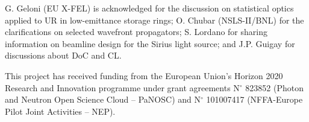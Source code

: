 \documentclass{iucr}              %
\begin{document}

{}

G. Geloni (EU X-FEL) is acknowledged for the discussion on statistical optics applied to UR in low-emittance storage rings; O. Chubar (NSLS-II/BNL) for the clarifications on selected wavefront propagators; S. Lordano for sharing information on beamline design for the Sirius light source; and J.P. Guigay for discussions about DoC and CL.


This project has received funding from the European Union’s Horizon 2020 Research and Innovation programme under grant agreements N$^{\circ}$ 823852 (Photon and Neutron Open Science Cloud -- PaNOSC) and N$^{\circ}$ 101007417 (NFFA-Europe Pilot Joint Activities -- NEP).


\end{document}
